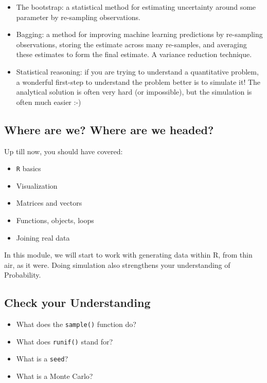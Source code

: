 \documentclass[
  letterpaper,
]{book}
\providecommand{\tightlist}{%
  \setlength{\itemsep}{0pt}\setlength{\parskip}{0pt}}\usepackage{longtable,booktabs,array}
\theoremstyle{definition}
\theoremstyle{definition}
\theoremstyle{plain}
\theoremstyle{definition}
\theoremstyle{plain}
\theoremstyle{plain}
\theoremstyle{remark}
\begin{document}
\begin{itemize}
\tightlist
\item
  The bootstrap: a statistical method for estimating uncertainty around
  some parameter by re-sampling observations.
\item
  Bagging: a method for improving machine learning predictions by
  re-sampling observations, storing the estimate across many re-samples,
  and averaging these estimates to form the final estimate. A variance
  reduction technique.
\item
  Statistical reasoning: if you are trying to understand a quantitative
  problem, a wonderful first-step to understand the problem better is to
  simulate it! The analytical solution is often very hard (or
  impossible), but the simulation is often much easier :-)
\end{itemize}

\hypertarget{where-are-we-where-are-we-headed-1}{%
\subsection*{Where are we? Where are we
headed?}\label{where-are-we-where-are-we-headed-1}}

Up till now, you should have covered:

\begin{itemize}
\tightlist
\item
  \texttt{R} basics
\item
  Visualization
\item
  Matrices and vectors
\item
  Functions, objects, loops
\item
  Joining real data
\end{itemize}

In this module, we will start to work with generating data within R,
from thin air, as it were. Doing simulation also strengthens your
understanding of Probability.

\hypertarget{check-your-understanding}{%
\subsection*{Check your Understanding}\label{check-your-understanding}}

\begin{itemize}
\tightlist
\item
  What does the \texttt{sample()} function do?
\item
  What does \texttt{runif()} stand for?
\item
  What is a \texttt{seed}?
\item
  What is a Monte Carlo?
\end{itemize}
\end{document}
